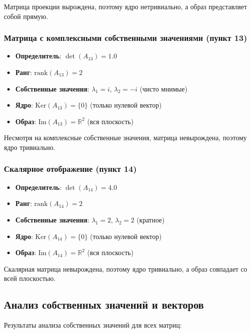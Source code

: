 Матрица проекции вырождена, поэтому ядро нетривиально, а образ представляет собой прямую.

\subsubsection*{Матрица с комплексными собственными значениями (пункт 13)}

\begin{itemize}
\item \textbf{Определитель}: $\det(A_{13}) = 1.0$
\item \textbf{Ранг}: $\text{rank}(A_{13}) = 2$
\item \textbf{Собственные значения}: $\lambda_1 = i$, $\lambda_2 = -i$ (чисто мнимые)
\item \textbf{Ядро}: $\text{Ker}(A_{13}) = \{0\}$ (только нулевой вектор)
\item \textbf{Образ}: $\text{Im}(A_{13}) = \mathbb{R}^2$ (вся плоскость)
\end{itemize}

Несмотря на комплексные собственные значения, матрица невырождена, поэтому ядро тривиально.

\subsubsection*{Скалярное отображение (пункт 14)}

\begin{itemize}
\item \textbf{Определитель}: $\det(A_{14}) = 4.0$
\item \textbf{Ранг}: $\text{rank}(A_{14}) = 2$
\item \textbf{Собственные значения}: $\lambda_1 = 2$, $\lambda_2 = 2$ (кратное)
\item \textbf{Ядро}: $\text{Ker}(A_{14}) = \{0\}$ (только нулевой вектор)
\item \textbf{Образ}: $\text{Im}(A_{14}) = \mathbb{R}^2$ (вся плоскость)
\end{itemize}

Скалярная матрица невырождена, поэтому ядро тривиально, а образ совпадает со всей плоскостью.

\subsection*{Анализ собственных значений и векторов}

Результаты анализа собственных значений для всех матриц:

